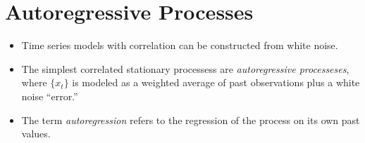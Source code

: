 \documentclass[11pt]{article}
\begin{document}
\section{Autoregressive Processes}

\begin{itemize}
    \item Time series models with correlation can be constructed from white noise.
    \item The simplest correlated stationary processess are \textit{autoregressive processeses},
    where $\{x_t\}$ is modeled as a weighted average of past observations plus a white noise 
    ``error.''
    \item The term \textit{autoregression} refers to the regression of the process on its own 
    past values. 
\end{itemize}
\end{document}
